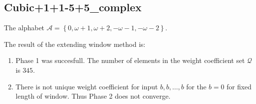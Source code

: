 \subsection{ Cubic+1+1-5+5\_complex }

\label{subsec:Cubic+1+1-5+5complex}

The alphabet $\mathcal{A} =\left\{0, \omega + 1, \omega + 2, -\omega - 1, -\omega - 2\right\}$.

\noindent The result of the extending window method is:
\begin{enumerate}
    \item Phase 1 was succesfull.
The number of elements in the weight coefficient set $\mathcal{Q}$ is $345$.

    \item There is not unique weight coefficient for input $b,b,\dots,b$ for the $b= 0 $ for fixed length of window. Thus Phase 2 does not converge.

\end{enumerate}
